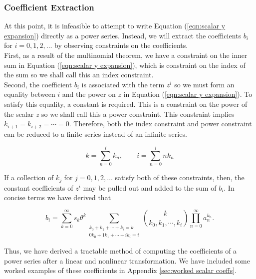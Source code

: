 \subsubsection{Coefficient Extraction}

At this point, it is infeasible to attempt to write Equation (\ref{eqn:scalar y expansion}) directly as a power series. Instead, we will extract the coefficients $b_i$ for $i = 0, 1, 2, \ldots$ by observing constraints on the coefficients.\\

First, as a result of the multinomial theorem, we have a constraint on the inner sum in Equation (\ref{eqn:scalar y expansion}), which is constraint on the index of the sum so we shall call this an index constraint.\\

Second, the coefficient $b_i$ is associated with the term $z^i$ so we must form an equality between $i$ and the power on $z$ in Equation (\ref{eqn:scalar y expansion}). To satisfy this equality, a constant is required. This is a constraint on the power of the scalar $z$ so we shall call this a power constraint. This constraint implies $k_{i + 1} = k_{i + 2} = \cdots = 0$. Therefore, both the index constraint and power constraint can be reduced to a finite series instead of an infinite series.

\begin{equation}
	k = \sum_{n=0}^{i} k_n, \qquad i = \sum_{n=0}^{i} n k_n
\end{equation}

If a collection of $k_j$ for $j = 0, 1, 2, \ldots$ satisfy both of these constraints, then, the constant coefficients of $z^i$ may be pulled out and added to the sum of $b_i$. In concise terms we have derived that

\begin{equation}
    b_i = \sum_{k=0}^{\infty} s_k \theta^k \sum_{\substack{k_0 + k_1 + \cdots + k_i = k \\ 0 k_0 + 1 k_1 + \cdots + i k_i = i}} \binom{k}{k_0, k_1, \cdots, k_i} \prod_{n=0}^{\infty} a_n^{k_n}.
	\label{eqn:scalar power series result}
\end{equation}

Thus, we have derived a tractable method of computing the coefficients of a power series after a linear and nonlinear transformation. We have included some worked examples of these coefficients in Appendix \ref{sec:worked scalar coeffs}.

